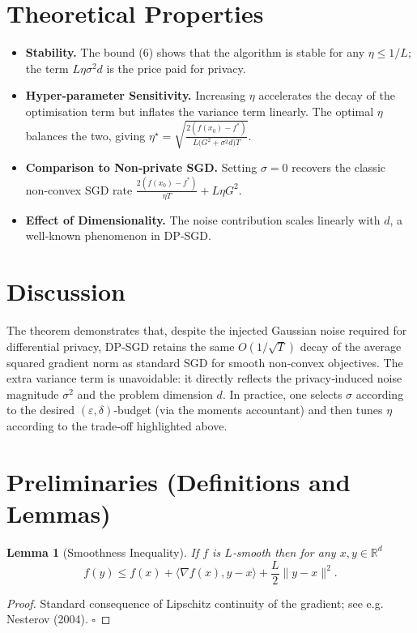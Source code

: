 \documentclass[11pt]{article}
\newtheorem{lemma}{Lemma}
\newcommand{\R}{\mathbb{R}}
\begin{document}
\section*{Theoretical Properties}
\begin{itemize}
    \item \textbf{Stability.} The bound (6) shows that the algorithm is stable for any $\eta\le 1/L$; the term $L\eta\sigma^{2}d$ is the price paid for privacy.
    \item \textbf{Hyper‑parameter Sensitivity.} Increasing $\eta$ accelerates the decay of the optimisation term but inflates the variance term linearly. The optimal $\eta$ balances the two, giving $\eta^{\star}= \sqrt{\frac{2(f(x_0)-f^{*})}{L\big(G^{2}+\sigma^{2}d\big)T}}$.
    \item \textbf{Comparison to Non‑private SGD.} Setting $\sigma=0$ recovers the classic non‑convex SGD rate $\frac{2(f(x_0)-f^{*})}{\eta T}+L\eta G^{2}$.
    \item \textbf{Effect of Dimensionality.} The noise contribution scales linearly with $d$, a well‑known phenomenon in DP‑SGD.
\end{itemize}

\section*{Discussion}
The theorem demonstrates that, despite the injected Gaussian noise required for differential privacy, DP‑SGD retains the same $O(1/\sqrt{T})$ decay of the average squared gradient norm as standard SGD for smooth non‑convex objectives. The extra variance term is unavoidable: it directly reflects the privacy‑induced noise magnitude $\sigma^{2}$ and the problem dimension $d$. In practice, one selects $\sigma$ according to the desired $(\varepsilon,\delta)$‑budget (via the moments accountant) and then tunes $\eta$ according to the trade‑off highlighted above.

\newpage

\section*{Preliminaries (Definitions and Lemmas)}
\begin{lemma}[Smoothness Inequality]
\label{lem:smooth}
If $f$ is $L$‑smooth then for any $x,y\in\R^{d}$
\[
f(y)\le f(x)+\langle\nabla f(x),y-x\rangle+\frac{L}{2}\|y-x\|^{2}.
\tag{7}
\]
\end{lemma}
\begin{proof}
Standard consequence of Lipschitz continuity of the gradient; see e.g. Nesterov (2004). \hfill $\square$
\end{proof}
\end{document}
